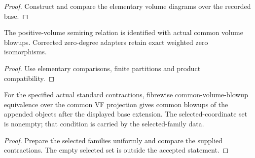 \begin{proof}


\leanok

Construct and compare the elementary volume diagrams over the recorded base.

\end{proof}

\begin{lemma}

\label{s7-4}


\leanok

The positive-volume semiring relation is identified with actual common volume blowups. Corrected zero-degree adapters retain exact weighted zero isomorphisms.

\end{lemma}

\begin{proof}


\leanok

Use elementary comparisons, finite partitions and product compatibility.

\end{proof}

\begin{lemma}

\label{s7-5}


\leanok

For the specified actual standard contractions, fibrewise common-volume-blowup equivalence over the common VF projection gives common blowups of the appended objects after the displayed base extension. The selected-coordinate set is nonempty; that condition is carried by the selected-family data.

\end{lemma}

\begin{proof}


\leanok

Prepare the selected families uniformly and compare the supplied contractions. The empty selected set is outside the accepted statement.

\end{proof}

